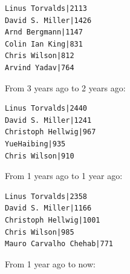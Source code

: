 \documentclass[a4paper]{article}
\begin{document}
\begin{itemize}
\begin{verbatim}
Linus Torvalds|2113
David S. Miller|1426
Arnd Bergmann|1147
Colin Ian King|831
Chris Wilson|812
Arvind Yadav|764
    \end{verbatim}
    From 3 years ago to 2 years ago:
    \begin{verbatim}
Linus Torvalds|2440
David S. Miller|1241
Christoph Hellwig|967
YueHaibing|935
Chris Wilson|910
    \end{verbatim}
    From 1 years ago to 1 year ago:
    \begin{verbatim}
Linus Torvalds|2358
David S. Miller|1166
Christoph Hellwig|1001
Chris Wilson|985
Mauro Carvalho Chehab|771
    \end{verbatim}
    From 1 year ago to now:
    \begin{verbatim}


\end{verbatim}
\end{itemize}
\end{document}
